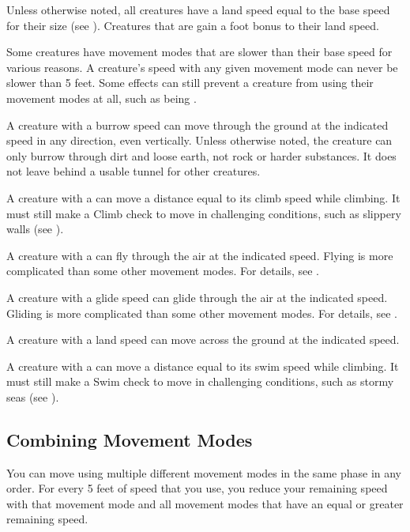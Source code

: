         Unless otherwise noted, all creatures have a land speed equal to the base speed for their size (see ).
        Creatures that are  gain a  foot bonus to their land speed.

        Some creatures have movement modes that are slower than their base speed for various reasons.
        A creature's speed with any given movement mode can never be slower than 5 feet.
        Some effects can still prevent a creature from using their movement modes at all, such as being \immobilized.

        A creature with a burrow speed can move through the ground at the indicated speed in any direction, even vertically.
        Unless otherwise noted, the creature can only burrow through dirt and loose earth, not rock or harder substances.
        It does not leave behind a usable tunnel for other creatures.

        A creature with a  can move a distance equal to its climb speed while climbing.
        It must still make a Climb check to move in challenging conditions, such as slippery walls (see ).

        A creature with a  can fly through the air at the indicated speed.
        Flying is more complicated than some other movement modes.
        For details, see .

        \label{Gliding}
        A creature with a glide speed can glide through the air at the indicated speed.
        Gliding is more complicated than some other movement modes.
        For details, see .

        A creature with a land speed can move across the ground at the indicated speed.

        A creature with a  can move a distance equal to its swim speed while climbing.
        It must still make a Swim check to move in challenging conditions, such as stormy seas (see ).

    \subsection{Combining Movement Modes}
        You can move using multiple different movement modes in the same phase in any order.
        For every 5 feet of speed that you use, you reduce your remaining speed with that movement mode and all movement modes that have an equal or greater remaining speed.

